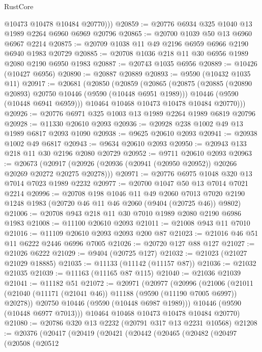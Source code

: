 \begin{lexlean}{RustCore}
\begin{coremodule}
          @10473
          @10478
          @10484
          @20770)))
@20859 := @20776 @6934 @325 @1040 @13 @1989 @2264 @6960 @6969 @20796
@20865 := @20700 @1039 @50 @13 @6960 @6967 @2214
@20875 := @20709 @1038 @11 @49 @2196 @6959 @6966 @2190 @6940 @1983 @20729
@20885 := @20708 @1036 @218 @11 @30 @6956 @1989 @2080 @2190 @6950 @1983
@20887 := @20743 @1035 @6956
@20889 := @10426 (@10427 @6956)
@20890 := @20887 @20889
@20893 := @9590 (@10432 @1035 @11)
@20917 := @20681
    (@20850
      (@20859
        (@20865
          (@20875
            (@20885 (@20890 @20893) @20750 @10446 (@9590 (@10448 @6951 @1989)))
            @10446
            (@9590 (@10448 @6941 @6959)))
          @10464
          @10468
          @10473
          @10478
          @10484
          @20770)))
@20926 := @20776 @6971 @325 @1003 @13 @1989 @2264 @1989 @6819 @20796
@20928 := @11330 @20610 @2093
@20936 := @20928 @238 @1002 @49 @13 @1989 @6817 @2093 @1090
@20938 := @9625 @20610 @2093
@20941 := @20938 @1002 @49 @6817
@20943 := @9634 @20610 @2093
@20950 := @20943 @133 @218 @11 @30 @2196 @2080 @20729
@20952 := @9711 @20610 @2093
@20963 := @20673
    (@20917 (@20926 (@20936 (@20941 (@20950 @20952)) @20266 @20269 @20272 @20275 @20278)))
@20971 := @20776 @6975 @1048 @320 @13 @7014 @7023 @1989 @2232
@20977 := @20700 @1047 @50 @13 @7014 @7021 @2214
@20996 := @20708
    @198
    @1046
    @11
    @49
    @2060
    @7013
    @7020
    @2190
    @1248
    @1983
    (@20720 @46 @11 @46 @2060 (@9404 (@20725 @46)) @9802)
@21006 := @20708 @943 @218 @11 @30 @7010 @1989 @2080 @2190 @6986 @1983
@21008 := @11100 @20610 @2093
@21011 := @21008 @943 @11 @7010
@21016 := @11109 @20610 @2093 @2093 @200 @87
@21023 := @21016 @46 @51 @11 @6222 @2446 @6996 @7005
@21026 := @20720 @127 @88 @127
@21027 := @21026 @6222
@21029 := @9404 (@20725 @127)
@21032 := @21023 (@21027 @21029 @18885)
@21035 := @11133 (@11142 (@11157 @87))
@21036 := @21032 @21035
@21039 := @11163 (@11165 @87 @115)
@21040 := @21036 @21039
@21041 := @11182 @51
@21072 := @20971
    (@20977
      (@20996
        (@21006
          (@21011 (@21040 (@11171 (@21041 @46)) @11188 (@9590 (@11190 @7005 @6997)) @20278))
          @20750
          @10446
          (@9590 (@10448 @6987 @1989)))
        @10446
        (@9590 (@10448 @6977 @7013)))
      @10464
      @10468
      @10473
      @10478
      @10484
      @20770)
@21080 := @20786 @320 @13 @2232 (@20791 @317 @13 @2231 @10568)
@21208 := @20376
    (@20417
      (@20419
        (@20421
          (@20442
            (@20465
              (@20482
                (@20497
                  (@20508
                    (@20512

\end{coremodule}
\end{lexlean}
